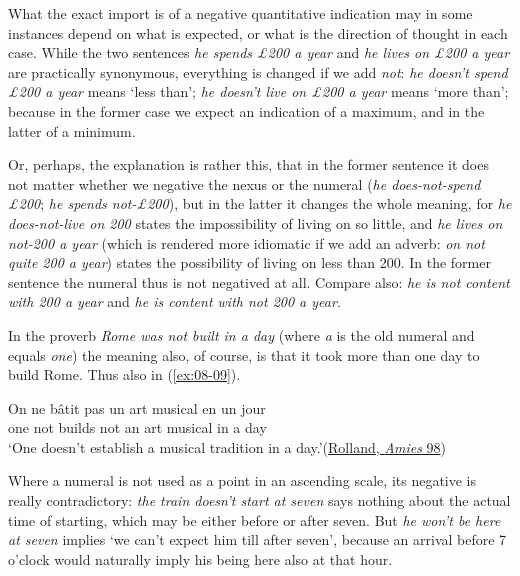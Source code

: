 What the exact import is of a negative quantitative indication may in some instances depend on what is expected, or what is the direction of thought in each case. While the two sentences \textit{he spends £200 a year} and \textit{he lives on £200 a year} are practically synonymous, everything is changed if we add \textit{not}: \textit{he doesn't spend £200 a year} means `less than'; \textit{he doesn't live on £200 a year} means `more than'; because in the former case we expect an indication of a maximum, and in the latter of a minimum.

Or, perhaps, the explanation is rather this, that in the former sentence it does not matter whether we negative the nexus or the numeral (\textit{he does-not-spend £200}; \textit{he spends not-£200}), but in the latter it changes the whole meaning, for \textit{he does-not-live on 200} states the impossibility of living on so little, and \textit{he lives on not-200 a year} (which is rendered more idiomatic if we add an adverb: \textit{on not quite 200 a year}) states the possibility of living on less than 200. In the former sentence the numeral thus is not negatived at all. Compare also: \textit{he is not content with 200 a year} and \textit{he is content with not 200 a year}.

In the proverb \textit{Rome was not built in a day} (where \textit{a} is the old numeral and equals \textit{one}) the meaning also, of course, is that it took more than one day to build Rome. Thus also in (\ref{ex:08-09}).

\ea \label{ex:08-09}
\gll On ne bâtit pas un art musical en un jour\\
 one not builds not an art musical in a day\\
\glt `One doesn't establish a musical tradition in a day.'\hfill(\href{https://www.gutenberg.org/cache/epub/61970/pg61970-images.html}{Rolland, \textit{Amies} 98}) %
\z

Where a numeral is not used as a point in an ascending scale, its negative is really contradictory: \textit{the train doesn't start at seven} says nothing about the actual time of starting, which may be either before or after seven. But \textit{he won't be here at seven} implies `we can't expect him till after seven', because an arrival before 7 o'clock would naturally imply his being here also at that hour. 


